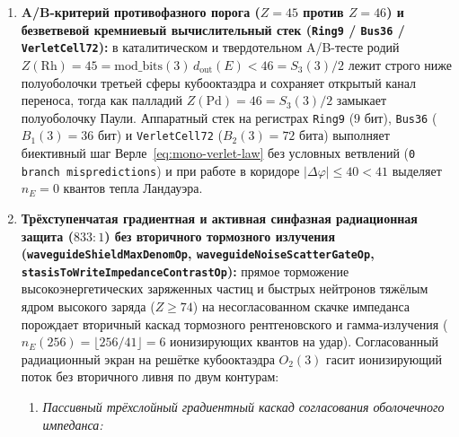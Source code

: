 \begin{theorem}[Резонансный замок седла $120 + 8 = 128 = Q_\square(3)$, барьер оболочечной пассивации $45^2 < 2\,048 < 46^2$, окно Френеля $288/289$ и безветвевая кремниевая архитектура в беспотерьном коридоре]
\begin{enumerate}[label=\textbf{(\arabic*)},leftmargin=*]
  \begin{equation}
    \label{eq:mono-882-masons-stothers}
    Z(\mathrm{AlO_4})^2 = 2\,025 \;<\; P_{\mathrm{Pauli}}(3) = 2\,048 \;<\; 2\,116 = Z(\mathrm{SiO_4})^2,
    \qquad
    T_{\mathrm{Fresnel}}(3) = \frac{|{\triangle}(3)|\,d_{\mathrm{in}}(\square)\,\mathrm{mod\_bits}(3)}{\bigl(\mathrm{mod\_bits}(3) + |{\triangle}(3)|\bigr)^2} = \frac{288}{289}.
  \end{equation}
\item \textbf{A/B-критерий противофазного порога ($Z = 45$ против $Z = 46$) и безветвевой кремниевый вычислительный стек (\texttt{Ring9} / \texttt{Bus36} / \texttt{VerletCell72}):}
  в каталитическом и твердотельном A/B-тесте родий $Z(\mathrm{Rh}) = 45 = \mathrm{mod\_bits}(3)\,d_{\mathrm{out}}(E) < 46 = S_3(3)/2$ лежит строго ниже полуоболочки третьей сферы кубооктаэдра и сохраняет открытый канал переноса, тогда как палладий $Z(\mathrm{Pd}) = 46 = S_3(3)/2$ замыкает полуоболочку Паули. Аппаратный стек на регистрах \texttt{Ring9} ($9\text{ бит}$), \texttt{Bus36} ($B_1(3) = 36\text{ бит}$) и \texttt{VerletCell72} ($B_2(3) = 72\text{ бита}$) выполняет биективный шаг Верле~\eqref{eq:mono-verlet-law} без условных ветвлений (\texttt{0 branch mispredictions}) и при работе в коридоре $|\Delta\varphi| \le 40 < 41$ выделяет $\hat{n}_E = 0$ квантов тепла Ландауэра.
\item \textbf{Трёхступенчатая градиентная и активная синфазная радиационная защита ($833 : 1$) без вторичного тормозного излучения (\texttt{waveguide\allowbreak Shield\allowbreak Max\allowbreak Denom\allowbreak Op}, \texttt{waveguide\allowbreak Noise\allowbreak Scatter\allowbreak Gate\allowbreak Op}, \texttt{stasis\allowbreak To\allowbreak Write\allowbreak Impedance\allowbreak Contrast\allowbreak Op}):}
  прямое торможение высокоэнергетических заряженных частиц и быстрых нейтронов тяжёлым ядром высокого заряда ($Z \ge 74$) на несогласованном скачке импеданса порождает вторичный каскад тормозного рентгеновского и гамма-излучения ($\hat{n}_E(256) = \lfloor 256 / 41 \rfloor = 6$ ионизирующих квантов на удар). Согласованный радиационный экран на решётке кубооктаэдра $O_2(3)$ гасит ионизирующий поток без вторичного ливня по двум контурам:
  \begin{enumerate}[label=\textbf{(\alph*)},leftmargin=*]
  \item \emph{Пассивный трёхслойный градиентный каскад согласования оболочечного импеданса:}

\end{enumerate}
\end{enumerate}
\end{theorem}
